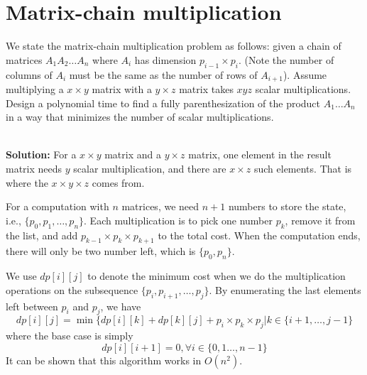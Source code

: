 \section{Matrix-chain multiplication}

We state the matrix-chain multiplication problem as follows: given a chain of matrices $A_1A_2\dots A_n$ where $A_i$ has dimension $p_{i-1}\times p_i$. (Note the number of columns of $A_i$ must be the same as the number of rows of $A_{i+1}$). Assume multiplying a $x\times y$ matrix with a $y\times z$ matrix takes $xyz$ scalar multiplications. Design a polynomial time to find a fully parenthesization of the product $A_1\dots A_n$ in a way that minimizes the number of scalar multiplications.

\ \\{\bf Solution:} For a $x\times y$ matrix and a $y\times z$ matrix, one element in the result matrix needs $y$ scalar multiplication, and there are $x\times z$ such elements. That is where the $x\times y\times z$ comes from.

For a computation with $n$ matrices, we need $n+1$ numbers to store the state, i.e., $\{p_0, p_1, \dots, p_n\}$. Each multiplication is to pick one number $p_k$, remove it from the list, and add $p_{k-1}\times p_k\times p_{k+1}$ to the total cost. When the computation ends, there will only be two number left, which is $\{p_0, p_n\}$.

We use $dp[i][j]$ to denote the minimum cost when we do the multiplication operations on the subsequence $\{p_i,p_{i+1},\dots,p_j\}$. By enumerating the last elements left between $p_i$ and $p_j$, we have 
\[
dp[i][j] = \min\{dp[i][k]+dp[k][j]+p_i\times p_k\times p_j | k\in\{i+1,\dots,j-1\}
\] 
where the base case is simply 
\[
dp[i][i+1] = 0, \forall i \in\{0,1\dots,n-1\}
\]
It can be shown that this algorithm works in $O(n^2)$.